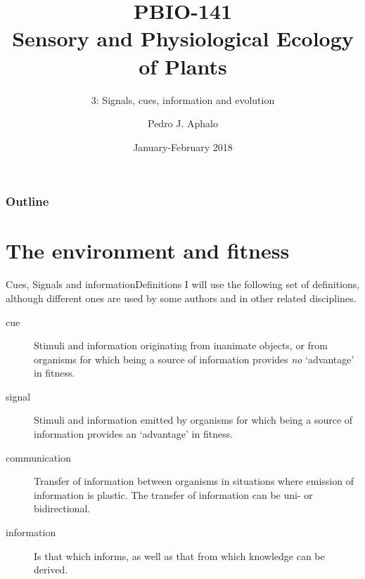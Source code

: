 \documentclass[10pt]{beamer}
\begin{document}
\title{PBIO-141\\Sensory and Physiological Ecology\\ of  Plants}
\subtitle{3: Signals, cues, information and evolution}
\author{Pedro J. Aphalo}
\date{January-February 2018}


  \begin{frame}
    \maketitle
  \end{frame}



  \begin{frame}
    \frametitle{Outline}
    \tableofcontents
  \end{frame}


\section{The environment and fitness}

\begin{frame}{Cues, Signals and information}{Definitions}
I will use the following set of definitions, although different ones are used by some authors and in other related disciplines.
  \begin{description}
     \item[cue] Stimuli and information originating from inanimate objects, or from organisms for which being a source of information provides \emph{no} `advantage' in fitness.
     \item[signal] Stimuli and information emitted by organisms for which being a source of information provides an `advantage' in fitness.
     \item[communication] Transfer of information between organisms in situations where emission of information is plastic. The transfer of information can be uni- or bidirectional.
     \item[information] Is that which informs, as well as that from which knowledge can be derived.
  \end{description}
\end{frame}
\end{document}
